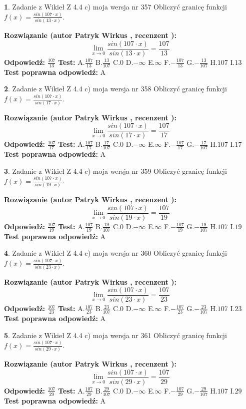 \documentclass[12pt, a4paper]{article}
\theoremstyle{definition} %
\newtheorem{zad}{}
\newcommand{\zadStart}[1]{\begin{zad}#1\newline}
\newcommand{\zadStop}{\end{zad}}
\newcommand{\rozwStart}[2]{\noindent \textbf{Rozwiązanie (autor #1 , recenzent #2): }\newline}
\newcommand{\rozwStop}{\newline}
\newcommand{\odpStart}{\noindent \textbf{Odpowiedź:}\newline}
\newcommand{\odpStop}{\newline}
\newcommand{\testStart}{\noindent \textbf{Test:}\newline}
\newcommand{\testStop}{\newline}
\newcommand{\kluczStart}{\noindent \textbf{Test poprawna odpowiedź:}\newline}
\newcommand{\kluczStop}{\newline}
\begin{document}
\zadStart{Zadanie z Wikieł Z 4.4 c) moja wersja nr 357}
Obliczyć granicę funkcji $f(x)=\frac{sin(107\cdot x)}{sin(13\cdot x)}$.
\zadStop
\rozwStart{Patryk Wirkus}{}
$$\lim\limits_{x\to 0}\frac{sin(107\cdot x)}{sin(13\cdot x)}=
\frac{107}{13}$$
\rozwStop
\odpStart
$\frac{107}{13}$
\odpStop
\testStart
A.$\frac{107}{13}$
B.$\frac{13}{107}$
C.$0$
D.$-\infty$
E.$\infty$
F.$-\frac{107}{13}$
G.$-\frac{13}{107}$
H.$107$
I.$13$
\testStop
\kluczStart
A
\kluczStop



\zadStart{Zadanie z Wikieł Z 4.4 c) moja wersja nr 358}
Obliczyć granicę funkcji $f(x)=\frac{sin(107\cdot x)}{sin(17\cdot x)}$.
\zadStop
\rozwStart{Patryk Wirkus}{}
$$\lim\limits_{x\to 0}\frac{sin(107\cdot x)}{sin(17\cdot x)}=
\frac{107}{17}$$
\rozwStop
\odpStart
$\frac{107}{17}$
\odpStop
\testStart
A.$\frac{107}{17}$
B.$\frac{17}{107}$
C.$0$
D.$-\infty$
E.$\infty$
F.$-\frac{107}{17}$
G.$-\frac{17}{107}$
H.$107$
I.$17$
\testStop
\kluczStart
A
\kluczStop



\zadStart{Zadanie z Wikieł Z 4.4 c) moja wersja nr 359}
Obliczyć granicę funkcji $f(x)=\frac{sin(107\cdot x)}{sin(19\cdot x)}$.
\zadStop
\rozwStart{Patryk Wirkus}{}
$$\lim\limits_{x\to 0}\frac{sin(107\cdot x)}{sin(19\cdot x)}=
\frac{107}{19}$$
\rozwStop
\odpStart
$\frac{107}{19}$
\odpStop
\testStart
A.$\frac{107}{19}$
B.$\frac{19}{107}$
C.$0$
D.$-\infty$
E.$\infty$
F.$-\frac{107}{19}$
G.$-\frac{19}{107}$
H.$107$
I.$19$
\testStop
\kluczStart
A
\kluczStop



\zadStart{Zadanie z Wikieł Z 4.4 c) moja wersja nr 360}
Obliczyć granicę funkcji $f(x)=\frac{sin(107\cdot x)}{sin(23\cdot x)}$.
\zadStop
\rozwStart{Patryk Wirkus}{}
$$\lim\limits_{x\to 0}\frac{sin(107\cdot x)}{sin(23\cdot x)}=
\frac{107}{23}$$
\rozwStop
\odpStart
$\frac{107}{23}$
\odpStop
\testStart
A.$\frac{107}{23}$
B.$\frac{23}{107}$
C.$0$
D.$-\infty$
E.$\infty$
F.$-\frac{107}{23}$
G.$-\frac{23}{107}$
H.$107$
I.$23$
\testStop
\kluczStart
A
\kluczStop



\zadStart{Zadanie z Wikieł Z 4.4 c) moja wersja nr 361}
Obliczyć granicę funkcji $f(x)=\frac{sin(107\cdot x)}{sin(29\cdot x)}$.
\zadStop
\rozwStart{Patryk Wirkus}{}
$$\lim\limits_{x\to 0}\frac{sin(107\cdot x)}{sin(29\cdot x)}=
\frac{107}{29}$$
\rozwStop
\odpStart
$\frac{107}{29}$
\odpStop
\testStart
A.$\frac{107}{29}$
B.$\frac{29}{107}$
C.$0$
D.$-\infty$
E.$\infty$
F.$-\frac{107}{29}$
G.$-\frac{29}{107}$
H.$107$
I.$29$
\testStop
\kluczStart
A
\kluczStop
\end{document}
